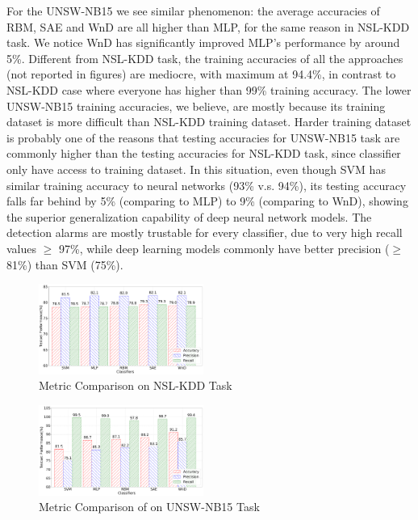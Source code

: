 For the UNSW-NB15 we see similar phenomenon: the average accuracies of RBM, SAE and WnD are
all higher than MLP, for the same reason in NSL-KDD task.
We notice WnD has significantly improved MLP's performance by around 5\%.
Different from NSL-KDD task, the training accuracies of all the approaches (not reported in figures) are mediocre,
with maximum at 94.4\%, in contrast to NSL-KDD case where everyone has higher than 99\% training accuracy.
The lower UNSW-NB15 training accuracies, we believe, are mostly because its training dataset
is more difficult than NSL-KDD training dataset.
Harder training dataset is probably one of the reasons that testing accuracies for UNSW-NB15 task
are commonly higher than the testing accuracies for NSL-KDD task,
since classifier only have access to training dataset.
In this situation, even though SVM has similar training accuracy to neural networks (93\% v.s. 94\%),
its testing accuracy falls far behind by 5\% (comparing to MLP) to 9\% (comparing to WnD),
showing the superior generalization capability of deep neural network models.
The detection alarms are mostly trustable for every classifier,
due to very high recall values $\geq$ 97\%,
while deep learning models commonly have better precision ($\geq$ 81\%) than SVM (75\%).

\begin{figure}[h]
    \centering
    \includegraphics[width=0.48\textwidth]{figures/comp_accuracy_nsl.pdf}
    \caption{Metric Comparison on NSL-KDD Task}
    \label{Fig:CompAccuracyNSL}
\end{figure}

\begin{figure}[h]
    \centering
    \includegraphics[width=0.48\textwidth]{figures/comp_accuracy_unsw.pdf}
    \caption{Metric Comparison of on UNSW-NB15 Task}
    \label{Fig:CompAccuracyUNSW}
\end{figure}


